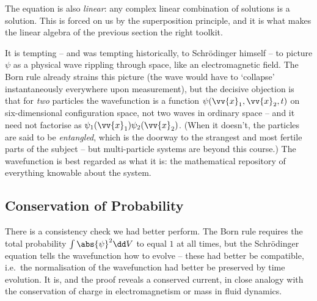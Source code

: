 \begin{remark}
    The equation is also \emph{linear}: any complex linear combination of solutions is a solution. This is forced on us by the superposition principle, and it is what makes the linear algebra of the previous section the right toolkit.
\end{remark}

\begin{remark}
    It is tempting -- and was tempting historically, to Schr\"odinger himself -- to picture $\psi$ as a physical wave rippling through space, like an electromagnetic field. The Born rule already strains this picture (the wave would have to `collapse' instantaneously everywhere upon measurement), but the decisive objection is that for \emph{two} particles the wavefunction is a function $\psi(\vv{x}_1, \vv{x}_2, t)$ on six-dimensional configuration space, not two waves in ordinary space -- and it need not factorise as $\psi_1(\vv{x}_1)\psi_2(\vv{x}_2)$. (When it doesn't, the particles are said to be \emph{entangled}, which is the doorway to the strangest and most fertile parts of the subject -- but multi-particle systems are beyond this course.) The wavefunction is best regarded as what it is: the mathematical repository of everything knowable about the system.
\end{remark}

\subsection{Conservation of Probability}

There is a consistency check we had better perform. The Born rule requires the total probability $\int \abs{\psi}^2 \dd V$ to equal $1$ at all times, but the Schr\"odinger equation tells the wavefunction how to evolve -- these had better be compatible, i.e.\ the normalisation of the wavefunction had better be preserved by time evolution. It is, and the proof reveals a conserved current, in close analogy with the conservation of charge in electromagnetism or mass in fluid dynamics.

